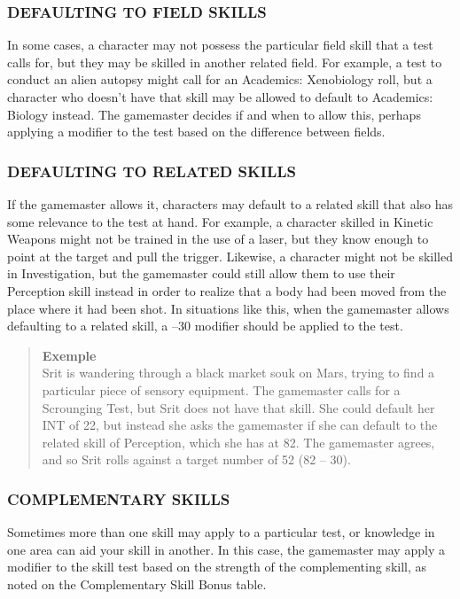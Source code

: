 \subsubsection{DEFAULTING TO FIELD SKILLS} In some cases, a character may not possess the particular field skill that a test calls for, but they may be skilled in another related field. For example, a test to conduct an alien autopsy might call for an Academics: Xenobiology roll, but a character who doesn’t have that skill may be allowed to default to Academics: Biology instead. The gamemaster decides if and when to allow this, perhaps applying a modifier to the test based on the difference between fields. 



\subsubsection{DEFAULTING TO RELATED SKILLS} If the gamemaster allows it, characters may default to a related skill that also has some relevance to the test at hand. For example, a character skilled in Kinetic Weapons might not be trained in the use of a laser, but they know enough to point at the target and pull the trigger. Likewise, a character might not be skilled in Investigation, but the gamemaster could still allow them to use their Perception skill instead in order to realize that a body had been moved from the place where it had been shot. In situations like this, when the gamemaster allows defaulting to a related skill, a –30 modifier should be applied to the test. 

\begin{quotation} \textbf{Exemple} \\ Srit is wandering through a black market souk on Mars, trying to find a particular piece of sensory equipment. The gamemaster calls for a Scrounging Test, but Srit does not have that skill. She could default her INT of 22, but instead she asks the gamemaster if she can default to the related skill of Perception, which she has at 82. The gamemaster agrees, and so Srit rolls against a target number of 52 (82 – 30). \end{quotation} 







\subsubsection{COMPLEMENTARY SKILLS} Sometimes more than one skill may apply to a particular test, or knowledge in one area can aid your skill in another. In this case, the gamemaster may apply a modifier to the skill test based on the strength of the complementing skill, as noted on the Complementary Skill Bonus table. 



